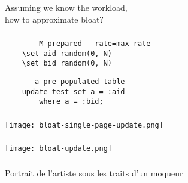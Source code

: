 \documentclass[usenames,dvipsnames, 18pt, compress, aspectratio=169]{beamer}
\begin{document}
\begin{frame}[fragile]{}
    \frametitle{}

    Assuming we know the workload,\\
    how to approximate bloat?
\end{frame}

\begin{frame}[fragile]{}
    \frametitle{}

    \begin{verbatim}
    -- -M prepared --rate=max-rate
    \set aid random(0, N)
    \set bid random(0, N)
    \end{verbatim}

    \begin{verbatim}
    -- a pre-populated table
    update test set a = :aid
        where a = :bid;
    \end{verbatim}

\end{frame}

\begin{frame}[fragile]{}
    \frametitle{}
    \begin{center}

        \texttt{[image: bloat-single-page-update.png]}

    \end{center}
\end{frame}

\begin{frame}[fragile]{}
    \frametitle{}
    \begin{center}

        \texttt{[image: bloat-update.png]}

    \end{center}
\end{frame}

\begin{frame}[fragile]{}
    \frametitle{}

    \begin{center}
     { \hspace{2.0cm} Portrait de l'artiste sous les traits d'un moqueur }
	\end{center}

\end{frame}
\end{document}
